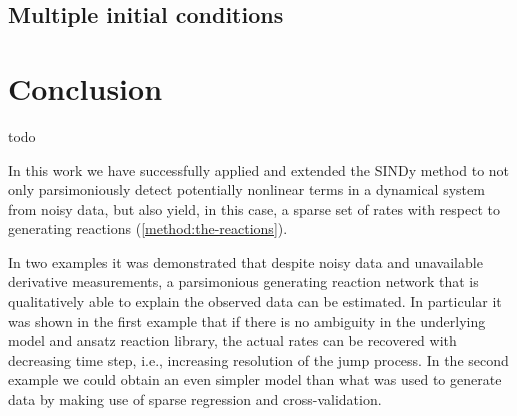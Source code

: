 \documentclass[oneside, abstracton, titlepage]{scrartcl}
\newenvironment{colbox}[1]
{\newcommand\colboxcolor{#1}%
	\begin{lrbox}{\selvestebox}%
		\begin{minipage}{\dimexpr\columnwidth-2\fboxsep\relax}}
		{\end{minipage}\end{lrbox}%
	\begin{center}
		\colorbox[HTML]{\colboxcolor}{\usebox{\selvestebox}}
\end{center}}
\begin{document}
	\subsection{Multiple initial conditions}\label{sec:case-3}
    
	\section{Conclusion}
	\begin{colbox}{F8E0E0}
		todo
	\end{colbox}
	In this work we have successfully applied and extended the SINDy method to not only parsimoniously detect potentially nonlinear terms in a dynamical system from noisy data, but also yield, in this case, a sparse set of rates with respect to generating reactions (\ref{method:the-reactions}).

	In two examples it was demonstrated that despite noisy data and unavailable derivative measurements, a parsimonious generating reaction network that is qualitatively able to explain the observed data can be estimated.
	In particular it was shown in the first example that if there is no ambiguity in the underlying model and ansatz reaction library, the actual rates can be recovered with decreasing time step, i.e., increasing resolution of the jump process.
	In the second example we could obtain an even simpler model than what was used to generate data by making use of sparse regression and cross-validation.

	\newpage
% 	
	
	
	\newpage	
\end{document}
